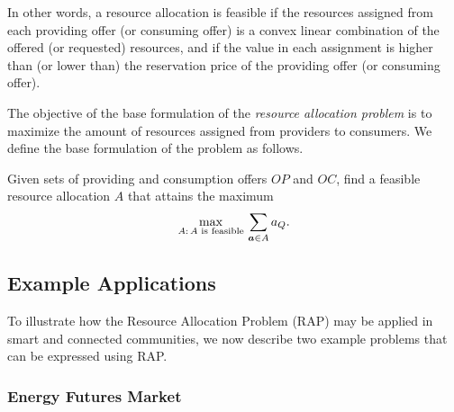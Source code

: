 In other words, a resource allocation is feasible if the resources assigned from each providing offer (or consuming offer) is a convex linear combination of the offered (or requested) resources, and if the value in each assignment is higher than (or lower than) the reservation price of the providing offer (or consuming offer).

The objective of the base formulation of the \emph{resource allocation problem} is to maximize the amount of resources assigned from providers to consumers.
We define the base formulation of the problem as follows.

\begin{definition}
Given sets of providing and consumption offers $O\!P$ and $OC$, find a feasible resource allocation $A$ that attains the maximum
\begin{equation}
\max_{A:\, A \textnormal{ is feasible}} \, 
\sum_{\va \in A} a_Q . \label{eq:objective}
\end{equation}
\end{definition}


\subsection{Example Applications}
\label{sec:ExaApp}

To illustrate how the Resource Allocation Problem (RAP) may be applied in smart and connected communities, we now describe two example problems that can be expressed using RAP.

\subsubsection{Energy Futures Market}
\label{sec:energyFuturesMarket}

